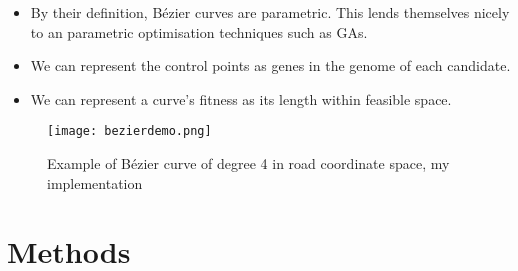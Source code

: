 \documentclass{beamer} \usepackage{pgfpages} \setbeamertemplate{bibliography item}{\insertbiblabel}
\begin{document}
\begin{frame}


    \begin{itemize}
        \item By their definition, Bézier curves are parametric. This lends themselves nicely to an parametric optimisation techniques such as GAs.
        \item We can represent the control points as genes in the genome of each candidate.
        \item We can represent a curve's fitness as its length within feasible space.
    \end{itemize}
\end{frame}

\begin{frame}
    \begin{figure}[htpb]
        \centering
        \texttt{[image: bezierdemo.png]}
        \caption{Example of Bézier curve of degree 4 in road coordinate space, my implementation}%
        \label{fig:bezierdemo}
    \end{figure}
\end{frame}

\section{Methods}
\end{document}
